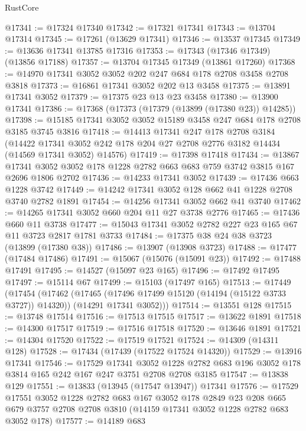 \begin{lexlean}{RustCore}
\begin{coremodule}
@17341 := @17324 @17340
@17342 := @17321 @17341
@17343 := @13704 @17314
@17345 := @17261 (@13629 @17341)
@17346 := @13537 @17345
@17349 := @13636 @17341 @13785 @17316
@17353 := @17343 (@17346 @17349) (@13856 @17188)
@17357 := @13704 @17345 @17349 (@13861 @17260)
@17368 := @14970 @17341 @3052 @3052 @202 @247 @684 @178 @2708 @3458 @2708 @3818
@17373 := @16861 @17341 @3052 @202 @13 @3458
@17375 := @13891 @17341 @3052
@17379 := @17375 @23 @13 @23 @3458
@17380 := @13900 @17341
@17386 := @17368 (@17373 (@17379 (@13899 (@17380 @23)) @14285))
@17398 := @15185 @17341 @3052 @3052 @15189 @3458 @247 @684 @178 @2708 @3185 @3745 @3816
@17418 := @14413
    @17341
    @247
    @178
    @2708
    @3184
    (@14422 @17341 @3052 @242 @178 @204 @27 @2708 @2776 @3182 @14434 (@14569 @17341 @3052) @14576)
@17419 := @17398 @17418
@17434 := @13867
    @17341
    @3052
    @3052
    @178
    @1228
    @2782
    @663
    @683
    @759
    @3742
    @3815
    @167
    @2696
    @1806
    @2702
@17436 := @14233 @17341 @3052
@17439 := @17436 @663 @1228 @3742
@17449 := @14242 @17341 @3052 @128 @662 @41 @1228 @2708 @3740 @2782 @1891
@17454 := @14256 @17341 @3052 @662 @41 @3740
@17462 := @14265 @17341 @3052 @660 @204 @11 @27 @3738 @2776
@17465 := @17436 @660 @11 @3738
@17477 := @15043 @17341 @3052 @2782 @227 @23 @165 @67 @11 @3723 @2817 @1781 @3733
@17484 := @17375 @38 @24 @38 @3723 (@13899 (@17380 @38))
@17486 := @13907 (@13908 @3723)
@17488 := @17477 (@17484 @17486)
@17491 := @15067 (@15076 (@15091 @23))
@17492 := @17488 @17491
@17495 := @14527 (@15097 @23 @165)
@17496 := @17492 @17495
@17497 := @15114 @67
@17499 := @15103 (@17497 @165)
@17513 := @17449
    (@17454
      (@17462
        (@17465 (@17496 @17499 @15120 (@14194 (@15122 @3733 @3727)) @14320))
        (@14291 @17341 @3052)))
@17514 := @13551 @128
@17515 := @13748 @17514
@17516 := @17513 @17515
@17517 := @13622 @1891
@17518 := @14300 @17517
@17519 := @17516 @17518
@17520 := @13646 @1891
@17521 := @14304 @17520
@17522 := @17519 @17521
@17524 := @14309 (@14311 @128)
@17528 := @17434 (@17439 (@17522 @17524 @14320))
@17529 := @13916 @17341
@17546 := @17529
    @17341
    @3052
    @1228
    @2782
    @683
    @196
    @3052
    @178
    @3814
    @165
    @242
    @167
    @247
    @3751
    @2708
    @2708
    @3185
@17547 := @13838 @129
@17551 := @13833 (@13945 (@17547 @13947)) @17341
@17576 := @17529
    @17551
    @3052
    @1228
    @2782
    @683
    @167
    @3052
    @178
    @2849
    @23
    @208
    @665
    @679
    @3757
    @2708
    @2708
    @3810
    (@14159 @17341 @3052 @1228 @2782 @683 @3052 @178)
@17577 := @14189 @683

\end{coremodule}
\end{lexlean}
